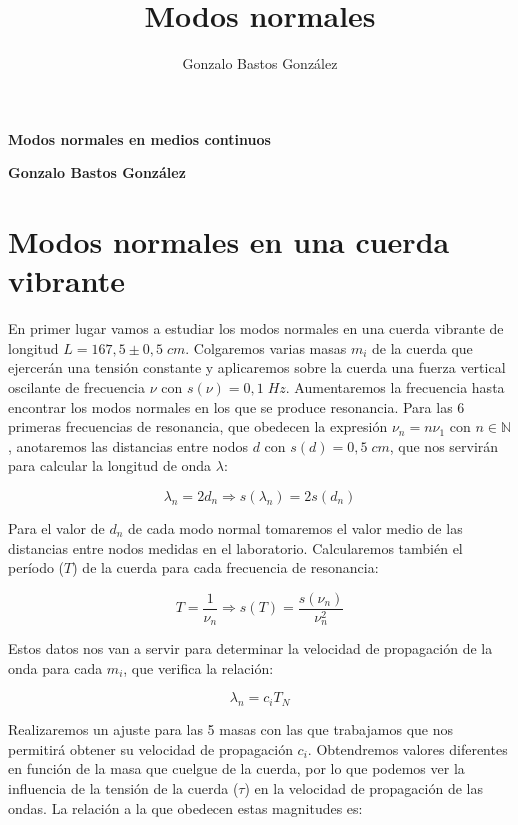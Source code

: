 \documentclass[a4paper,12pt,titlepage]{article}
\title{Modos normales}
\author{Gonzalo Bastos González}
\begin{document}
\begin{center}
    \textbf{\Large Modos normales en medios continuos}
\end{center}

\begin{center}
    \textbf{Gonzalo Bastos González}
\end{center}

\section{Modos normales en una cuerda vibrante}

En primer lugar vamos a estudiar los modos normales en una cuerda vibrante de longitud $L=167,5\pm0,5\; cm$. Colgaremos varias masas $m_i$ de la cuerda que ejercerán una tensión constante y aplicaremos sobre la cuerda una fuerza vertical oscilante de frecuencia $\nu$ con $s(\nu)=0,1\;Hz$. Aumentaremos la frecuencia hasta encontrar los modos normales en los que se produce resonancia. Para las 6 primeras frecuencias de resonancia, que obedecen la expresión $\nu_n=n\nu_1$ con $n\in \mathbb{N}$, anotaremos las distancias entre nodos $d$ con $s(d)=0,5\;cm$, que nos servirán para calcular la longitud de onda $\lambda$:

\begin{equation}
    \lambda_n = 2d_n \Rightarrow s(\lambda_n) =2s(d_n)
\end{equation}

Para el valor de $d_n$ de cada modo normal tomaremos el valor medio de las distancias entre nodos medidas en el laboratorio. Calcularemos también el período ($T$) de la cuerda para cada frecuencia de resonancia:

\begin{equation}
    T = \frac{1}{\nu_n} \Rightarrow s(T) = \frac{s(\nu_n)}{\nu_n^2}
\end{equation}

Estos datos nos van a servir para determinar la velocidad de propagación de la onda para cada $m_i$, que verifica la relación:

\begin{equation}
    \lambda_n=c_iT_N
    \label{v propagación}
\end{equation}

Realizaremos un ajuste para las 5 masas con las que trabajamos que nos permitirá obtener su velocidad de propagación $c_i$. Obtendremos valores diferentes en función de la masa que cuelgue de la cuerda, por lo que podemos ver la influencia de la tensión de la cuerda ($\tau$) en la velocidad de propagación de las ondas. La relación a la que obedecen estas magnitudes es:
\end{document}
